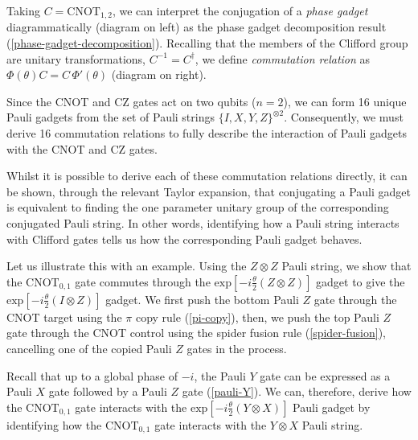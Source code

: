 Taking $C = \text{CNOT}_{1, 2}$, we can interpret the conjugation of a \textit{phase gadget} diagrammatically (diagram on left) as the phase gadget decomposition result (\ref{phase-gadget-decomposition}). Recalling that the members of the Clifford group are unitary transformations, $C^{-1} = C^\dagger$, we define \textit{commutation relation} as $\Phi(\theta) C = C \, \Phi'(\theta)$ (diagram on right).


Since the CNOT and CZ gates act on two qubits ($n=2$), we can form 16 unique Pauli gadgets from the set of Pauli strings $\{I, X, Y, Z\}^{\otimes 2}$. Consequently, we must derive 16 commutation relations to fully describe the interaction of Pauli gadgets with the CNOT and CZ gates.


Whilst it is possible to derive each of these commutation relations directly, it can be shown, through the relevant Taylor expansion, that conjugating a Pauli gadget is equivalent to finding the one parameter unitary group of the corresponding conjugated Pauli string. In other words, identifying how a Pauli string interacts with Clifford gates tells us how the corresponding Pauli gadget behaves.

Let us illustrate this with an example. Using the $Z \otimes Z$ Pauli string, we show that the $\text{CNOT}_{0, 1}$ gate commutes through the $\text{exp} \left[ - i\frac{\theta}{2} \left( Z \otimes Z \right) \right]$ gadget to give the $\text{exp} \left[ - i\frac{\theta}{2} \left( I \otimes Z \right) \right]$ gadget. We first push the bottom Pauli $Z$ gate through the CNOT target using the $\pi$ copy rule (\ref{pi-copy}), then, we push the top Pauli $Z$ gate through the CNOT control using the spider fusion rule (\ref{spider-fusion}), cancelling one of the copied Pauli $Z$ gates in the process.


Recall that up to a global phase of $-i$, the Pauli $Y$ gate can be expressed as a Pauli $X$ gate followed by a Pauli $Z$ gate (\ref{pauli-Y}). We can, therefore, derive how the $\text{CNOT}_{0, 1}$ gate interacts with the $\text{exp} \left[ - i\frac{\theta}{2} \left(Y \otimes X \right) \right]$ Pauli gadget by identifying how the CNOT$_{0, 1}$ gate interacts with the $Y \otimes X$ Pauli string.

